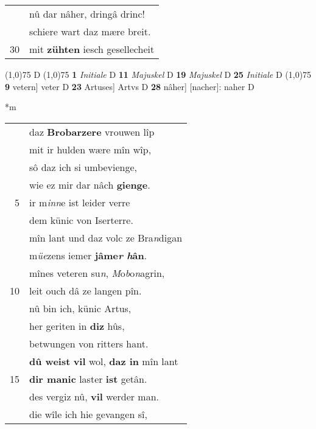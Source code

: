 \documentclass[8pt,a4paper,notitlepage]{article}
\begin{document}
\begin{table}[ht]
\begin{minipage}[t]{0.5\linewidth}
\begin{tabular}{rl}
 & nû dar nâher, dringâ drinc!\\ 
 & schiere wart daz mære breit.\\ 
30 & mit \textbf{zühten} iesch gesellecheit\\ 
\end{tabular}
\scriptsize
\line(1,0){75} \newline
D \newline
\line(1,0){75} \newline
\textbf{1} \textit{Initiale} D  \textbf{11} \textit{Majuskel} D  \textbf{19} \textit{Majuskel} D  \textbf{25} \textit{Initiale} D  \newline
\line(1,0){75} \newline
\textbf{9} vetern] veter D \textbf{23} Artuses] Artvs D \textbf{28} nâher] [nacher]: naher D \newline
\end{minipage}
\hspace{0.5cm}
\begin{minipage}[t]{0.5\linewidth}
\small
\begin{center}*m
\end{center}
\begin{tabular}{rl}
 & daz \textbf{Brobarzere} vrouwen lîp\\ 
 & mit ir hulden wære mîn wîp,\\ 
 & sô daz ich si umbevienge,\\ 
 & wie ez mir dar nâch \textbf{gienge}.\\ 
5 & ir m\textit{inn}e ist leider verre\\ 
 & dem künic von Iserterre.\\ 
 & mîn lant und daz volc ze Bra\textit{n}digan\\ 
 & m\textit{üe}zens iemer \textbf{jâme\textit{r} \textit{h}ân}.\\ 
 & mînes veteren su\textit{n}, \textit{M}o\textit{b}o\textit{n}agrin,\\ 
10 & leit ouch dâ ze langen pîn.\\ 
 & nû bin ich, künic Artus,\\ 
 & her geriten in \textbf{diz} hûs,\\ 
 & betwungen von ritters hant.\\ 
 & \textbf{dû weist} \textbf{vil} wol, \textbf{daz in} mîn lant\\ 
15 & \textbf{dir manic} laster \textbf{ist} getân.\\ 
 & des vergiz nû, \textbf{vil} werder man.\\ 
 & die wîle ich hie gevangen sî,\\ 

\end{tabular}
\end{minipage}
\end{table}
\end{document}
